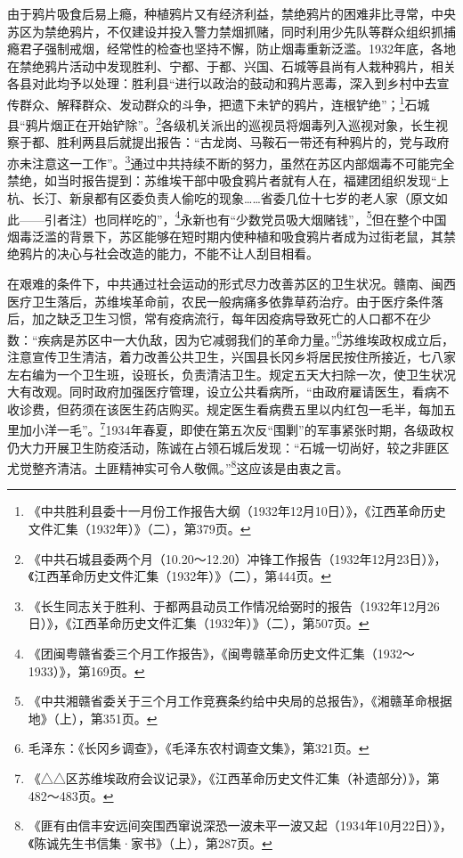 由于鸦片吸食后易上瘾，种植鸦片又有经济利益，禁绝鸦片的困难非比寻常，中央苏区为禁绝鸦片，不仅建设并投入警力禁烟抓赌，同时利用少先队等群众组织抓捕瘾君子强制戒烟，经常性的检查也坚持不懈，防止烟毒重新泛滥。1932年底，各地在禁绝鸦片活动中发现胜利、宁都、于都、兴国、石城等县尚有人栽种鸦片，相关各县对此均予以处理：胜利县“进行以政治的鼓动和鸦片恶毒，深入到乡村中去宣传群众、解释群众、发动群众的斗争，把遗下未铲的鸦片，连根铲绝”；\footnote{《中共胜利县委十一月份工作报告大纲（1932年12月10日）》，《江西革命历史文件汇集（1932年）》（二），第379页。}石城县“鸦片烟正在开始铲除”。\footnote{《中共石城县委两个月（10.20～12.20）冲锋工作报告（1932年12月23日）》，《江西革命历史文件汇集（1932年）》（二），第444页。}各级机关派出的巡视员将烟毒列入巡视对象，长生视察于都、胜利两县后就提出报告：“古龙岗、马鞍石一带还有种鸦片的，党与政府亦未注意这一工作”。\footnote{《长生同志关于胜利、于都两县动员工作情况给弼时的报告（1932年12月26日）》，《江西革命历史文件汇集（1932年）》（二），第507页。}通过中共持续不断的努力，虽然在苏区内部烟毒不可能完全禁绝，如当时报告提到：苏维埃干部中吸食鸦片者就有人在，福建团组织发现“上杭、长汀、新泉都有区委负责人偷吃的现象……省委几位十七岁的老人家（原文如此——引者注）也同样吃的”，\footnote{《团闽粤赣省委三个月工作报告》，《闽粤赣革命历史文件汇集（1932～1933）》，第169页。}永新也有“少数党员吸大烟赌钱”，\footnote{《中共湘赣省委关于三个月工作竞赛条约给中央局的总报告》，《湘赣革命根据地》（上），第351页。}但在整个中国烟毒泛滥的背景下，苏区能够在短时期内使种植和吸食鸦片者成为过街老鼠，其禁绝鸦片的决心与社会改造的能力，不能不让人刮目相看。


在艰难的条件下，中共通过社会运动的形式尽力改善苏区的卫生状况。赣南、闽西医疗卫生落后，苏维埃革命前，农民一般病痛多依靠草药治疗。由于医疗条件落后，加之缺乏卫生习惯，常有疫病流行，每年因疫病导致死亡的人口都不在少数：“疾病是苏区中一大仇敌，因为它减弱我们的革命力量。”\footnote{毛泽东：《长冈乡调查》，《毛泽东农村调查文集》，第321页。}苏维埃政权成立后，注意宣传卫生清洁，着力改善公共卫生，兴国县长冈乡将居民按住所接近，七八家左右编为一个卫生班，设班长，负责清洁卫生。规定五天大扫除一次，使卫生状况大有改观。同时政府加强医疗管理，设立公共看病所，“由政府雇请医生，看病不收诊费，但药须在该医生药店购买。规定医生看病费五里以内红包一毛半，每加五里加小洋一毛”。\footnote{《△△区苏维埃政府会议记录》，《江西革命历史文件汇集（补遗部分）》，第482～483页。}1934年春夏，即使在第五次反“围剿”的军事紧张时期，各级政权仍大力开展卫生防疫活动，陈诚在占领石城后发现：“石城一切尚好，较之非匪区尤觉整齐清洁。土匪精神实可令人敬佩。”\footnote{《匪有由信丰安远间突围西窜说深恐一波未平一波又起（1934年10月22日）》，《陈诚先生书信集·家书》（上），第287页。}这应该是由衷之言。


